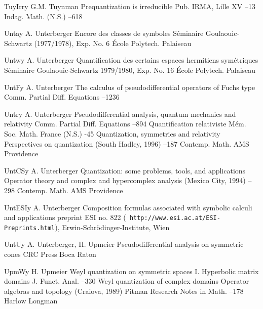 \documentclass[12pt]{amsart}
\numberwithin{equation}{section}
\theoremstyle{remark}
\newcommand{\by}{\mathbf y}
\begin{document}
\begin{thebibliography}{199}
 TuyIrr\by{ G.M. Tuynman \paper Prequantization is irreducible \jour
Pub. IRMA, Lille   \issue  XV --13 \moreref \jour Indag.
Math. (N.S.)   --618}

 Unta\by{ A. Unterberger \paper Encore des classes de symboles \inbook
S\'eminaire Goulaouic-Schwartz (1977/1978), Exp. No. 6 \publ \'Ecole Polytech.
\publaddr Palaiseau }

 Untw\by{ A. Unterberger \paper Quantification des certains espaces
hermitiens sym\'etriques \inbook S\'eminaire Goulaouic-Schwartz 1979/1980, Exp.
No. 16 \publ \'Ecole Polytech. \publaddr Palaiseau }

 UntF\by{ A. Unterberger \paper The calculus of pseudodifferential
operators of Fuchs type \jour Comm. Partial Diff. Equations  
--1236}

 Untr\by{ A. Unterberger \paper Pseudodifferential analysis, quantum
mechanics and relativity \jour Comm. Partial Diff. Equations  
--894 \moreref \paper Quantification relativiste \jour M\'em. Soc.
Math. France (N.S.) -45  \moreref \paper Quantization,
symmetries and relativity \inbook Perspectives on quantization (South Hadley,
1996) --187 \bookinfo Contemp. Math.  \publ AMS \publaddr
Providence }

 UntCS\by{ A. Unterberger \paper Quantization: some problems, tools, and
applications \inbook Operator theory and complex and hypercomplex analysis
(Mexico City, 1994) --298 \bookinfo Contemp. Math.  \publ AMS
\publaddr Providence }

 UntESI\by{ A. Unterberger \paper Composition formulas associated with
symbolic calculi and applications \paperinfo preprint ESI no. 822 ({\tt
http://www.esi.ac.at/ESI-Preprints.html}), Erwin-Schr\"odinger-Institute, Wien
}

 UntU\by{ A. Unterberger, H. Upmeier \book Pseudodifferential analysis on
symmetric cones \publ CRC Press \publaddr Boca Raton }

 UpmW\by{ H. Upmeier \paper Weyl quantization on symmetric spaces I.
Hyperbolic matrix domains \jour J. Funct. Anal.   --330 \moreref \paper Weyl quantization of complex domains \inbook Operator
algebras and topology (Craiova, 1989) \bookinfo Pitman Research Notes in Math.
 --178 \publaddr Harlow \publ Longman }


\end{thebibliography}
\end{document}
